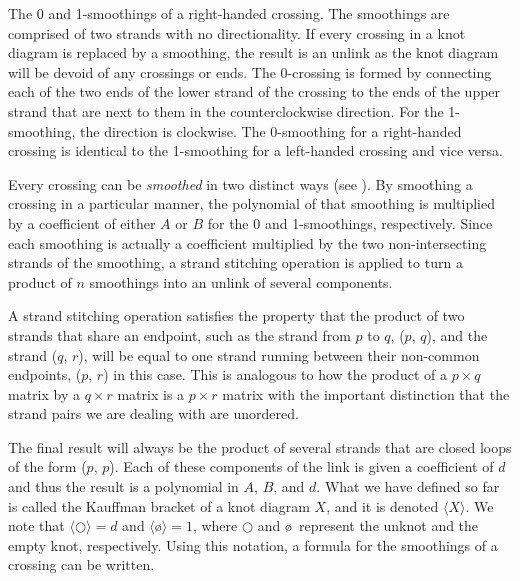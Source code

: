\begin{paper}
{The 0 and 1-smoothings of a right-handed crossing.
The smoothings are comprised of two strands with no directionality.
If every crossing in a knot diagram is replaced by a smoothing, the result is an
unlink as the knot diagram will be devoid of any crossings or ends.
The 0-crossing is formed by connecting each of the two ends of the lower strand
of the crossing to the ends of the upper strand that are next to them in the
counterclockwise direction.
For the 1-smoothing, the direction is clockwise.
The 0-smoothing for a right-handed crossing is identical to the 1-smoothing for
a left-handed crossing and vice versa.}

Every crossing can be \textit{smoothed} in two distinct ways (see
\figSmoothings).
By smoothing a crossing in a particular manner, the polynomial of that smoothing
is multiplied by a coefficient of either $A$ or $B$ for the 0 and 1-smoothings,
respectively.
Since each smoothing is actually a coefficient multiplied by the two
non-intersecting strands of the smoothing, a strand stitching operation is
applied to turn a product of $n$ smoothings into an unlink of several
components.

A strand stitching operation satisfies the property that the product of two
strands that share an endpoint, such as the strand from $p$ to $q$, ($p$, $q$),
and the strand ($q$, $r$), will be equal to one strand running between their
non-common endpoints, ($p$, $r$) in this case.
This is analogous to how the product of a $p\times q$ matrix by a $q\times r$
matrix is a $p\times r$ matrix with the important distinction that the strand
pairs we are dealing with are unordered.

The final result will always be the product of several strands that are closed
loops of the form ($p$, $p$).
Each of these components of the link is given a coefficient of $d$ and thus the
result is a polynomial in $A$, $B$, and $d$.
What we have defined so far is called the Kauffman bracket of a knot diagram
$X$, and it is denoted $\langle X\rangle$.
We note that $\langle\bigcirc\rangle=d$ and $\langle$\o$\rangle=1$, where
$\bigcirc$ and \o~represent the unknot and the empty knot, respectively.
Using this notation, a formula for the smoothings of a crossing can be written.


\end{paper}
